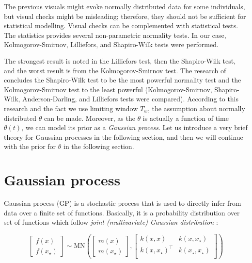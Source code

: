 \documentclass[
  digital, %
  oneside, %
  lof,     %
  lot,     %
]{fithesis4}
\begin{document}
The previous visuals might evoke normally distributed data for some individuals, but visual checks might be misleading; therefore, they should not be sufficient for statistical modelling.
Visual checks can be complemented with statistical tests.
The statistics provides several non-parametric normality tests.
In our case, Kolmogorov-Smirnov, Lilliefors, and Shapiro-Wilk tests were performed.





The strongest result is noted in the Lilliefors test, then the Shapiro-Wilk test, and the worst result is from the Kolmogorov-Smirnov test.
The research of \cite{razali2011} concludes the Shapiro-Wilk test to be the most powerful normality test and the Kolmogorov-Smirnov test to the least powerful (Kolmogorov-Smirnov, Shapiro-Wilk, Anderson-Darling, and Lilliefors tests were compared).
According to this research and the fact we use limiting window $T_w$, the assumption about normally distributed $\theta$ can be made.
Moreover, as the $\theta$ is actually a function of time $\theta(t)$, we can model its prior as a \textit{Gaussian process}.
Let us introduce a very brief theory for Gaussian processes in the following section, and then we will continue with the prior for $\theta$ in the following section.


\section{Gaussian process}

Gaussian process (GP) is a stochastic process that is used to directly infer from data over a finite set of functions.
Basically, it is a probability distribution over set of functions which follow \textit{joint (multivariate) Gaussian distribution} \cite{frigola2015}:

\begin{equation}
    \begin{bmatrix}
      f(x) \\ f(x_\star)
    \end{bmatrix} \sim \text{MN}\left(
    \begin{bmatrix}
      m(x) \\ m(x_\star)
    \end{bmatrix},
    \begin{bmatrix}
      k(x, x) & k(x, x_\star) \\ 
      k(x, x_\star)^\top & k(x_\star, x_\star) \\ 
    \end{bmatrix}
  \right)
\end{equation}
\end{document}
